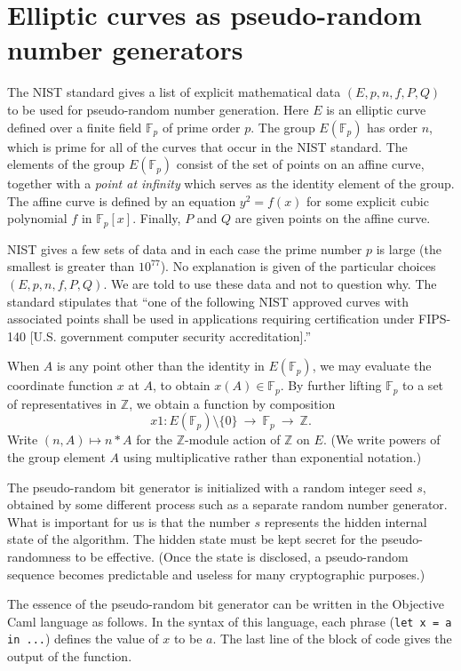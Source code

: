 \documentclass[11pt]{amsart} %
\newcommand{\ring}[1]{\mathbb{#1}}
\begin{document}
\section{Elliptic curves as pseudo-random number generators}

The NIST standard gives a list of explicit mathematical data $(E,p,n,f,P,Q)$ to be used for 
pseudo-random number generation.
Here $E$ is an elliptic curve defined over a finite field $\ring{F}_p$ of prime order $p$.  
The group $E(\ring{F}_p)$ has order $n$, which is prime for all of the curves that occur in the NIST standard.
The elements of the group $E(\ring{F}_p)$ consist of the set of points on an affine curve, 
together with a {\it point at infinity} which
serves as the identity element of the group.
The affine curve is defined by an equation $y^2 = f(x)$
for some explicit cubic polynomial $f$ in $\ring{F}_p[x]$.
Finally, $P$ and $Q$ are given points on the affine curve. 

NIST gives a few sets of  data and in each case the  prime number $p$ is large (the smallest is greater than $10^{77}$).
No explanation is given of the particular choices $(E,p,n,f,P,Q)$.  We are told to
use these data and not to question why.
The standard stipulates that ``one of the following NIST approved curves with associated points 
shall be used in applications requiring certification under FIPS-140 [U.S. government computer security accreditation].'' 

When $A$ is any point other than the identity in $E(\ring{F}_p)$,
we may evaluate the coordinate function $x$ at $A$, to obtain $x(A)\in \ring{F}_p$.  By further lifting
$\ring{F}_p$ to a set of representatives in $\ring{Z}$, we obtain a function
by composition
\[
x1 : E(\ring{F}_p)\setminus\{0\}~ \to~ \ring{F}_p~\to~ \ring{Z}.
\]
Write  $(n,A)\mapsto n * A$
for the $\ring{Z}$-module action of $\ring{Z}$ on $E$.  (We write powers of the group element $A$ using
multiplicative rather than exponential notation.)


The pseudo-random bit generator is initialized with a random integer seed $s$, obtained
by some different process such as a separate  random number generator. 
What is important for us is that the number $s$ represents the hidden internal state of the
algorithm.  The hidden state must be kept secret for the pseudo-randomness to be effective.
(Once the state is disclosed, a pseudo-random sequence becomes predictable and useless for
many cryptographic purposes.)

The essence of the pseudo-random bit 
generator can be written in the Objective Caml language as follows.
In the syntax of this language, 
each phrase (\verb!let x = a in ...!) defines the value of $x$ to be $a$.
The last line of the block of code gives the output of the function.
\end{document}
